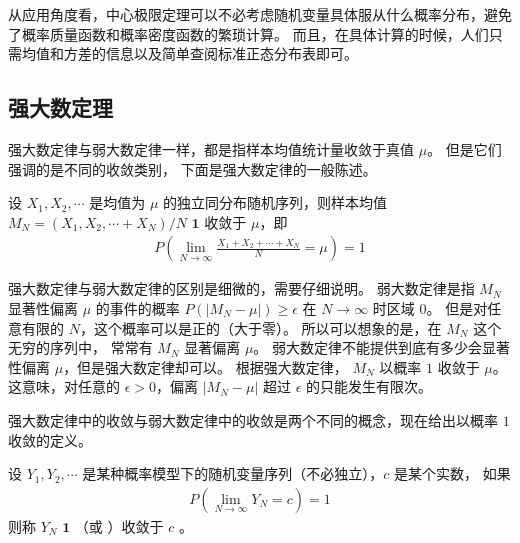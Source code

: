 \documentclass[letterpaper,10pt,english]{sphinxmanual}
\begin{document}
从应用角度看，中心极限定理可以不必考虑随机变量具体服从什么概率分布，避免了概率质量函数和概率密度函数的繁琐计算。
而且，在具体计算的时候，人们只需均值和方差的信息以及简单查阅标准正态分布表即可。


\subsection{强大数定理}
\label{\detokenize{_u63a8_u65ad_u4e0e_u68c0_u9a8c/content:id11}}
强大数定律与弱大数定律一样，都是指样本均值统计量收敛于真值 \(\mu\)。
但是它们强调的是不同的收敛类别，
下面是强大数定律的一般陈述。

\begin{sphinxShadowBox}

设 \(X_1,X_2,\cdots\) 是均值为 \(\mu\) 的独立同分布随机序列，则样本均值 \(M_N=(X_1,X_2,\cdots+X_N)/N\)
 \(\pmb{1}\) 收敛于 \(\mu\)，即
\begin{equation}\label{equation:推断与检验/content:推断与检验/content:45}
\begin{split}P\left ( \lim_{N \rightarrow \infty} \frac{X_1+X_2+\cdots+X_N}{N} = \mu \right ) = 1\end{split}
\end{equation}\end{sphinxShadowBox}

强大数定律与弱大数定律的区别是细微的，需要仔细说明。
弱大数定律是指 \(M_N\) 显著性偏离 \(\mu\) 的事件的概率 \(P(|M_N -\mu|)\geq \epsilon\)
在 \(N \rightarrow \infty\) 时区域 \(0\)。
但是对任意有限的 \(N\)，这个概率可以是正的（大于零）。
所以可以想象的是，在 \(M_N\) 这个无穷的序列中，
常常有 \(M_N\) 显著偏离 \(\mu\)。
弱大数定律不能提供到底有多少会显著性偏离 \(\mu\)，但是强大数定律却可以。
根据强大数定律， \(M_N\) 以概率 \(1\) 收敛于 \(\mu\)。
这意味，对任意的 \(\epsilon >0\)，偏离 \(|M_N-\mu|\) 超过 \(\epsilon\) 的只能发生有限次。

强大数定律中的收敛与弱大数定律中的收敛是两个不同的概念，现在给出以概率 \(1\) 收敛的定义。

\begin{sphinxShadowBox}

设 \(Y_1,Y_2,\cdots\) 是某种概率模型下的随机变量序列（不必独立），\(c\) 是某个实数，
如果
\begin{equation}\label{equation:推断与检验/content:推断与检验/content:46}
\begin{split}P(\lim_{N \rightarrow \infty} Y_N=c) = 1\end{split}
\end{equation}
则称 \(Y_N\)  \(\pmb{1}\) （或  ）收敛于 \(c\) 。
\end{sphinxShadowBox}
\end{document}

